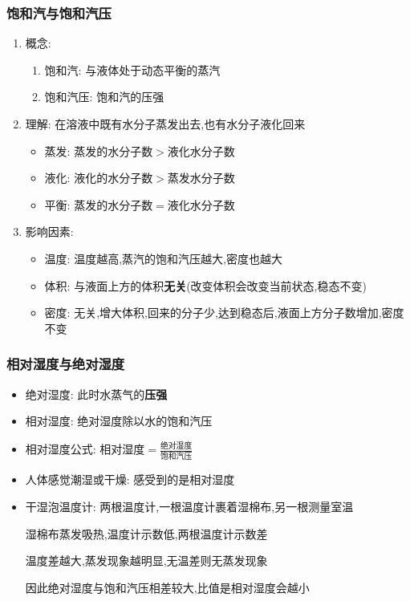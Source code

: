 \documentclass{article}
\begin{document}
\subsubsection{饱和汽与饱和汽压}
\begin{enumerate}
    \item 概念:
          \begin{enumerate}[label = (\arabic*)]
              \item 饱和汽: 与液体处于动态平衡的蒸汽
              \item 饱和汽压: 饱和汽的压强
          \end{enumerate}
    \item 理解: 在溶液中既有水分子蒸发出去,也有水分子液化回来
          \begin{itemize}
              \item 蒸发: 蒸发的水分子数$>$液化水分子数
              \item 液化: 液化的水分子数$>$蒸发水分子数
              \item 平衡: 蒸发的水分子数$=$液化水分子数
          \end{itemize}
    \item 影响因素:
          \begin{itemize}
              \item 温度: 温度越高,蒸汽的饱和汽压越大,密度也越大
              \item 体积: 与液面上方的体积\textbf{无关}(改变体积会改变当前状态,稳态不变)
              \item 密度: 无关,增大体积,回来的分子少,达到稳态后,液面上方分子数增加,密度不变
          \end{itemize}
\end{enumerate}

\vspace{2em}

\subsubsection{相对湿度与绝对湿度}
\begin{itemize}
    \item 绝对湿度: 此时水蒸气的\textbf{压强}
    \item 相对湿度: 绝对湿度除以水的饱和汽压
    \item 相对湿度公式: $ \text{相对湿度} = \frac{\text{绝对湿度}}{\text{饱和汽压}} $
    \item 人体感觉潮湿或干燥: 感受到的是相对湿度
    \item 干湿泡温度计: 两根温度计,一根温度计裹着湿棉布,另一根测量室温

          \hspace{6.6em} 湿棉布蒸发吸热,温度计示数低,两根温度计示数差

          \hspace{6.6em} 温度差越大,蒸发现象越明显,无温差则无蒸发现象

          \hspace{6.6em} 因此绝对湿度与饱和汽压相差较大,比值是相对湿度会越小
\end{itemize}
\end{document}
